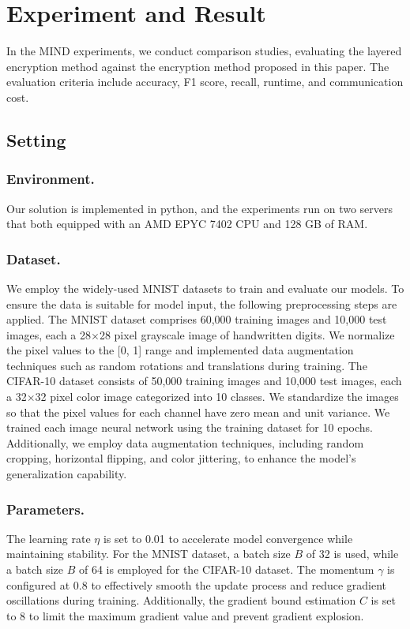 \documentclass[conference]{IEEEtran}
\begin{document}
\section{Experiment and Result}
In the MIND experiments, we conduct comparison studies, evaluating the layered encryption method against the encryption method proposed in this paper. The evaluation criteria include accuracy, F1 score, recall, runtime, and communication cost.

\subsection{Setting}
\subsubsection{Environment.} Our solution is implemented in python, and the experiments run on two servers that both equipped with an AMD EPYC 7402 CPU and 128 GB of RAM.
\subsubsection{Dataset.} 
We employ the widely-used MNIST datasets \cite{xiao2017fashion} to train and evaluate our models. To ensure the data is suitable for model input, the following preprocessing steps are applied. The MNIST dataset comprises 60,000 training images and 10,000 test images, each a 28$\times$28 pixel grayscale image of handwritten digits. We normalize the pixel values to the [0, 1] range and implemented data augmentation techniques such as random rotations and translations during training. The CIFAR-10 dataset consists of 50,000 training images and 10,000 test images, each a 32$\times$32 pixel color image categorized into 10 classes. We standardize the images so that the pixel values for each channel have zero mean and unit variance. We trained each image neural network using the training dataset for 10 epochs. Additionally, we employ data augmentation techniques, including random cropping, horizontal flipping, and color jittering, to enhance the model's generalization capability.




\subsubsection{Parameters.} 
The learning rate $\eta$ is set to 0.01 to accelerate model convergence while maintaining stability. For the MNIST dataset, a batch size $B$ of 32 is used, while a batch size $B$ of 64 is employed for the CIFAR-10 dataset. The momentum $\gamma$ is configured at 0.8 to effectively smooth the update process and reduce gradient oscillations during training. Additionally, the gradient bound estimation $C$ is set to 8 to limit the maximum gradient value and prevent gradient explosion.
\end{document}
